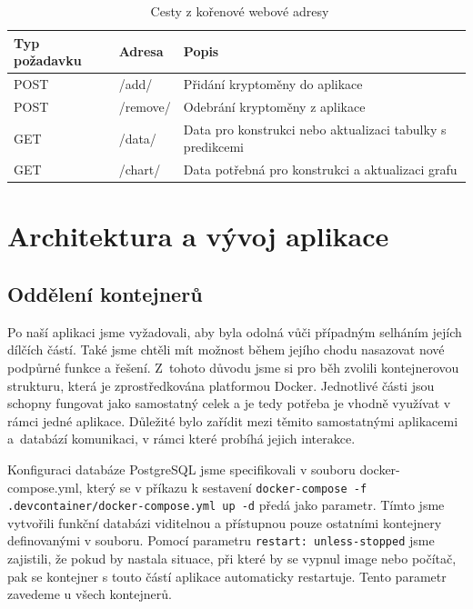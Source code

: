 \begin{table}\centering
    \caption{~Cesty z kořenové webové adresy}\label{paths}
    \begin{tabular}{l|l|l}
        Typ požadavku & Adresa & Popis	\tabularnewline \hline 
        POST & /add/		    & Přidání kryptoměny do aplikace	\tabularnewline \hline
        POST & /remove/       & Odebrání kryptoměny z aplikace	\tabularnewline \hline
        GET & /data/		    & Data pro konstrukci nebo aktualizaci tabulky s predikcemi	\tabularnewline \hline
        GET &  /chart/	    & Data potřebná pro konstrukci a aktualizaci grafu	\tabularnewline
    \end{tabular}
\end{table}

\chapter{Architektura a vývoj aplikace}

\section{Oddělení kontejnerů}

Po naší aplikaci jsme vyžadovali, aby byla odolná vůči případným selháním jejích dílčích částí. 
Také jsme chtěli mít možnost během jejího chodu nasazovat nové podpůrné funkce a řešení. 
Z~tohoto důvodu jsme si pro běh zvolili kontejnerovou strukturu, která je zprostředkována platformou Docker. 
Jednotlivé části jsou schopny fungovat jako samostatný celek a je tedy potřeba je vhodně využívat v rámci jedné aplikace. 
Důležité bylo zařídit mezi těmito samostatnými aplikacemi a~databází komunikaci, v rámci které probíhá jejich interakce. 

Konfiguraci databáze PostgreSQL jsme specifikovali v souboru docker-compose.yml, který se v příkazu k sestavení \verb|docker-compose -f .devcontainer/docker-compose.yml up -d| předá jako parametr. 
Tímto jsme vytvořili funkční databázi viditelnou a přístupnou pouze ostatními kontejnery definovanými v souboru. 
Pomocí parametru \verb|restart: unless-stopped| jsme zajistili, že pokud by nastala situace, při které by se vypnul image nebo počítač, pak se kontejner s touto částí aplikace automaticky restartuje. 
Tento parametr zavedeme u všech kontejnerů. 

